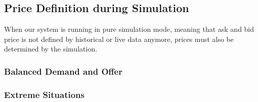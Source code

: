%
%
%

\subsection{Price Definition during Simulation}

When our system is running in pure simulation mode, meaning that ask and bid price is
not defined by historical or live data anymore, prices must also be determined by the
simulation. 

\subsubsection{Balanced Demand and Offer}

\subsubsection{Extreme Situations}

